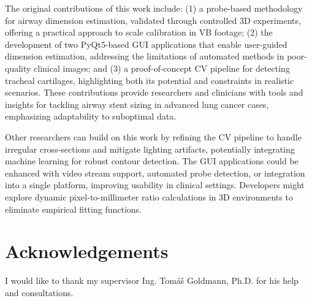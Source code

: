 The original contributions of this work include: (1) a probe-based methodology for airway dimension estimation, validated through controlled 3D experiments, offering a practical approach to scale calibration in VB footage; (2) the development of two PyQt5-based GUI applications that enable user-guided dimension estimation, addressing the limitations of automated methods in poor-quality clinical images; and (3) a proof-of-concept CV pipeline for detecting tracheal cartilages, highlighting both its potential and constraints in realistic scenarios. These contributions provide researchers and clinicians with tools and insights for tackling airway stent sizing in advanced lung cancer cases, emphasizing adaptability to suboptimal data.

Other researchers can build on this work by refining the CV pipeline to handle irregular cross-sections and mitigate lighting artifacts, potentially integrating machine learning for robust contour detection. The GUI applications could be enhanced with video stream support, automated probe detection, or integration into a single platform, improving usability in clinical settings. Developers might explore dynamic pixel-to-millimeter ratio calculations in 3D environments to eliminate empirical fitting functions.

\section*{Acknowledgements}
I would like to thank my supervisor Ing. Tomáš Goldmann, Ph.D. for his help and consultations.